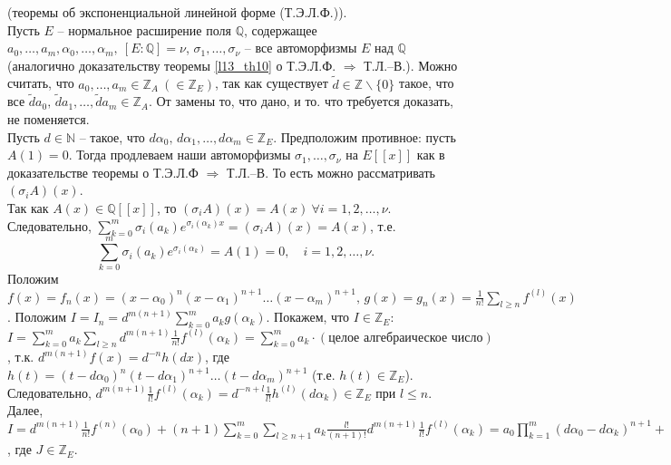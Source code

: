 \begin{pf} (теоремы об экспоненциальной линейной форме (Т.Э.Л.Ф.)).\\
	Пусть $E$ -- нормальное расширение поля $\mathbb{Q}$, содержащее $a_0,\dots,a_m,\alpha_0,\dots,\alpha_m, \ [E \colon \mathbb{Q}] = \nu$, $\sigma_1,\dots,\sigma_\nu$ -- все автоморфизмы $E$ над $\mathbb{Q}$ (аналогично доказательству теоремы \ref{l13_th10} о Т.Э.Л.Ф. $\Rightarrow$ Т.Л.--В.). 
	Можно считать, что $a_0, \dots, a_m \in \mathbb{Z}_A \ (\in \mathbb{Z}_E)$, так как существует $\tilde{d} \in \mathbb{Z} \backslash \{ 0 \}$ такое, что все $\tilde{d}a_0, \, \tilde{d}a_1, \dots, \tilde{d}a_m \in \mathbb{Z}_A$. От замены то, что дано, и то. что требуется доказать, не поменяется.\\
	Пусть $d \in \mathbb{N}$ -- такое, что $d\alpha_0, \, d\alpha_1, \dots, d\alpha_m \in \mathbb{Z}_E$. Предположим противное: пусть $A(1)=0$. Тогда продлеваем наши автоморфизмы $\sigma_1, \dots, \sigma_\nu$ на $E[[x]]$ как в доказательстве теоремы о Т.Э.Л.Ф $\Rightarrow$ Т.Л.--В. То есть можно рассматривать $(\sigma_iA)(x)$.\\
	Так как $A(x) \in \mathbb{Q}[[x]]$, то $(\sigma_iA)(x) = A(x) \ \forall i = 1,2,\dots,\nu$. Следовательно, $\displaystyle \sum\limits_{k=0}^m \sigma_i (a_k) e^{\sigma_i(\alpha_k)x} = (\sigma_iA)(x) = A(x)$, т.е.
	$$\sum\limits_{k=0}^m \sigma_i(a_k)e^{\sigma_i(\alpha_k)} = A(1) = 0, \quad i = 1,2,\dots,\nu.$$
	Положим $\displaystyle f(x) = f_n(x) = (x-\alpha_0)^n(x-\alpha_1)^{n+1}\dots(x-\alpha_m)^{n+1}, \, g(x) = g_n(x) = \frac{1}{n!} \sum\limits_{l \geq n} f^{(l)}(x)$. 
	Положим $\displaystyle I=I_n = d^{m(n+1)} \sum\limits_{k=0}^m a_kg(\alpha_k)$. Покажем, что $I \in \mathbb{Z}_E$:\\
	$\displaystyle I = \sum\limits_{k=0}^m a_k \sum\limits_{l \geq n} d^{m(n+1)}\frac{1}{n!}f^{(l)}(\alpha_k) = \sum\limits_{k=0}^m a_k \cdot (\text{целое алгебраическое число})$, т.к. $d^{m(n+1)}f(x) = d^{-n}h(dx)$, где $h(t) = (t-d\alpha_0)^n(t-d\alpha_1)^{n+1}\dots(t-d\alpha_m)^{n+1}$ (т.е. $h(t) \in \mathbb{Z}_E$). 
	Следовательно, $\displaystyle d^{m(n+1)}\frac{1}{l!}f^{(l)}(\alpha_k) = d^{-n+l}\frac{1}{l!}h^{(l)}(d\alpha_k) \in \mathbb{Z}_E$ при $l \leq n$. Далее,\\
	$\displaystyle I = d^{m(n+1)}\frac{1}{n!}f^{(n)}(\alpha_0) + (n+1)\sum\limits_{k=0}^m\sum\limits_{l \geq n+1} a_k\frac{l!}{(n+1)!}d^{m(n+1)}\frac{1}{l!}f^{(l)}(\alpha_k) = a_0\prod\limits_{k=1}^m (d\alpha_0-d\alpha_k)^{n+1} + (n+1)J$, где $J \in \mathbb{Z}_E$.\\

\end{pf}
